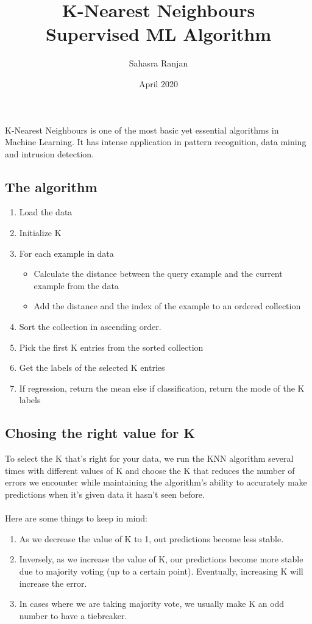 \documentclass[12pt, A4]{report}
\title{\textbf{K-Nearest Neighbours}\\ \large{Supervised ML Algorithm}}
\author{Sahasra Ranjan}
\date{April 2020}
\begin{document}
\begin{titlepage}
\maketitle
\end{titlepage}

K-Nearest Neighbours is one of the most basic yet essential algorithms in Machine Learning. It has intense application in pattern recognition, data mining and intrusion detection.

\subsection*{The algorithm}
	\begin{enumerate}
		\item Load the data
		\item Initialize K
		\item For each example in data
		\begin{itemize}
			\item Calculate the distance between the query example and the current example from the data
			\item Add the distance and the index of the example to an ordered collection
		\end{itemize}
		\item Sort the collection in ascending order.
		\item Pick the first K entries from the sorted collection
		\item Get the labels of the selected K entries
		\item If regression, return the mean else if classification, return the mode of the K labels
	\end{enumerate}

\subsection*{Chosing the right value for K}
	To select the K that’s right for your data, we run the KNN algorithm several times with different values of K and choose the K that reduces the number of errors we encounter while maintaining the algorithm’s ability to accurately make predictions when it’s given data it hasn’t seen before.\\ \\
	Here are some things to keep in mind:
	\begin{enumerate}
		\item As we decrease the value of K to 1, out predictions become less stable.
		\item Inversely, as we increase the value of K, our predictions become more stable due to majority voting (up to a certain point). Eventually, increasing K will increase the error.
		\item In cases where we are taking majority vote, we usually make K an odd number to have a tiebreaker. 
	\end{enumerate}
\end{document}
